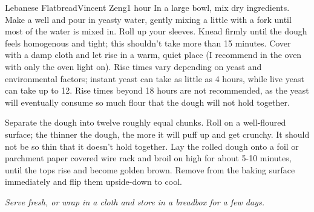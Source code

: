 \begin{recipe}{Lebanese Flatbread}{Vincent Zeng}{1 hour}
	In a large bowl, mix dry ingredients. Make a well and pour in yeasty water, gently mixing a little with a fork until most of the water is mixed in. Roll up your sleeves. Knead firmly until the dough feels homogenous and tight; this shouldn't take more than 15 minutes. Cover with a damp cloth and let rise in a warm, quiet place (I recommend in the oven with only the oven light on). Rise times vary depending on yeast and environmental factors; instant yeast can take as little as 4 hours, while live yeast can take up to 12. Rise times beyond 18 hours are not recommended, as the yeast will eventually consume so much flour that the dough will not hold together.

	Separate the dough into twelve roughly equal chunks. Roll on a well-floured surface; the thinner the dough, the more it will puff up and get crunchy. It should not be so thin that it doesn't hold together. Lay the rolled dough onto a foil or parchment paper covered wire rack and broil on high for about 5-10 minutes, until the tops rise and become golden brown. Remove from the baking surface immediately and flip them upside-down to cool.
\end{recipe}
\textit{Serve fresh, or wrap in a cloth and store in a breadbox for a few days.}
